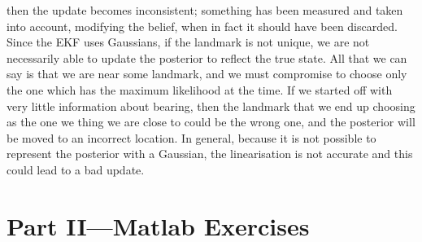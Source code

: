 \documentclass[a4paper,12pt]{article}
\begin{document}
\begin{enumerate}[resume]
  then the update becomes inconsistent; something has been measured and taken
  into account, modifying the belief, when in fact it should have been
  discarded. Since the EKF uses Gaussians, if the landmark is not unique, we are
  not necessarily able to update the posterior to reflect the true state. All
  that we can say is that we are near some landmark, and we must compromise to
  choose only the one which has the maximum likelihood at the time. If we
  started off with very little information about bearing, then the landmark that
  we end up choosing as the one we thing we are close to could be the wrong one,
  and the posterior will be moved to an incorrect location. In general, because
  it is not possible to represent the posterior with a Gaussian, the
  linearisation is not accurate and this could lead to a bad update. 
\end{enumerate}
\section{Part II---Matlab Exercises}
\end{document}
